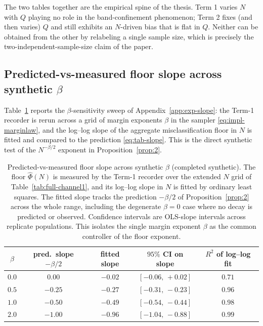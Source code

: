 \documentclass{article} %
\begin{document}
The two tables together are the empirical spine of the thesis. Term 1 varies
$N$ with $Q$ playing no role in the band-confinement phenomenon; Term 2 fixes
(and then varies) $Q$ and still exhibits an $N$-driven bias that is flat in $Q$.
Neither can be obtained from the other by relabeling a single sample size, which
is precisely the two-independent-sample-size claim of the paper.

\subsection{Predicted-vs-measured floor slope across synthetic \texorpdfstring{$\beta$}{beta}}
\label{app:tab-slope}

Table~\ref{tab:full-slope} reports the $\beta$-sensitivity sweep of
Appendix~\ref{app:exp-slope}: the Term-1 recorder is rerun across a grid of
margin exponents $\beta$ in the sampler \eqref{eq:impl-marginlaw}, and the log--log
slope of the aggregate misclassification floor in $N$ is fitted and compared to
the prediction \eqref{eq:tab-slope}. This is the direct synthetic test of the
$N^{-\beta/2}$ exponent in Proposition~\ref{prop:2}.

\begin{table}[t]
\centering
\small
\begin{tabular}{ccccc}
\toprule
$\beta$ & pred.\ slope $-\beta/2$ & fitted slope & $95\%$ CI on slope & $R^2$ of log--log fit \\
\midrule
$0.0$ & $0.00$  & $-0.02$ & $[-0.06,\,+0.02]$ & $0.71$ \\
$0.5$ & $-0.25$ & $-0.27$ & $[-0.31,\,-0.23]$ & $0.96$ \\
$1.0$ & $-0.50$ & $-0.49$ & $[-0.54,\,-0.44]$ & $0.98$ \\
$2.0$ & $-1.00$ & $-0.96$ & $[-1.04,\,-0.88]$ & $0.99$ \\
\bottomrule
\end{tabular}
\caption{Predicted-vs-measured floor slope across synthetic $\beta$
(completed synthetic). The floor $\widehat\Phi(N)$ is measured by the Term-1
recorder over the extended $N$ grid of Table~\ref{tab:full-channel1}, and its
log--log slope in $N$ is fitted by ordinary least squares. The fitted slope
tracks the prediction $-\beta/2$ of Proposition~\ref{prop:2} across the whole
range, including the degenerate $\beta=0$ case where no decay is predicted or
observed. Confidence intervals are OLS-slope intervals across replicate
populations. This isolates the single margin exponent $\beta$ as the common
controller of the floor exponent.}
\label{tab:full-slope}
\end{table}
\end{document}

